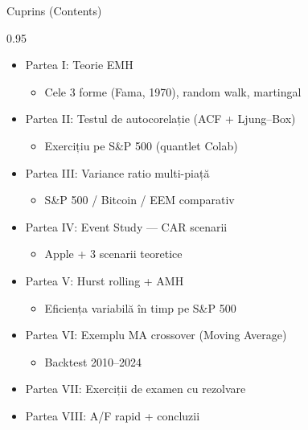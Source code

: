 \documentclass[9pt, aspectratio=169, t]{beamer}
\subtitle{Seminar EMH --- Ipoteza Pieței Eficiente (Efficient Market Hypothesis)}
\begin{document}
{
\begin{frame}
    \titlepage
\end{frame}
}

\newcommand{\ch}[1]{\href{https://colab.research.google.com/github/QuantLet/Stat_fin_markets/blob/master/Ch_04/SFM_ch4_#1/SFM_ch4_#1.ipynb}{#1}}

\begin{frame}[shrink=15]{Cuprins (Contents)}
\begin{cminipage}{0.95\textwidth}
\begin{itemize}\setlength{\itemsep}{0pt}
    \item Partea I: Teorie EMH
    \begin{itemize}\setlength{\itemsep}{0pt}
        \item Cele 3 forme (Fama, 1970), random walk, martingal
    \end{itemize}
    \item Partea II: Testul de autocorelație (ACF + Ljung--Box)
    \begin{itemize}\setlength{\itemsep}{0pt}
        \item Exercițiu pe S\&P 500 (quantlet Colab)
    \end{itemize}
    \item Partea III: Variance ratio multi-piață
    \begin{itemize}\setlength{\itemsep}{0pt}
        \item S\&P 500 / Bitcoin / EEM comparativ
    \end{itemize}
    \item Partea IV: Event Study --- CAR scenarii
    \begin{itemize}\setlength{\itemsep}{0pt}
        \item Apple + 3 scenarii teoretice
    \end{itemize}
    \item Partea V: Hurst rolling + AMH
    \begin{itemize}\setlength{\itemsep}{0pt}
        \item Eficiența variabilă în timp pe S\&P 500
    \end{itemize}
    \item Partea VI: Exemplu MA crossover (Moving Average)
    \begin{itemize}\setlength{\itemsep}{0pt}
        \item Backtest 2010--2024
    \end{itemize}
    \item Partea VII: Exerciții de examen cu rezolvare
    \item Partea VIII: A/F rapid + concluzii
\end{itemize}
\end{cminipage}
\end{frame}
\end{document}
